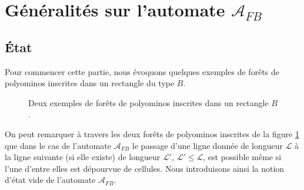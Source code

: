 \section{ Généralités sur l'automate $\mathcal{A}_{FB}$}
\begin{spacing}{0.30}
\subsection{État}
\end{spacing}
Pour commencer cette partie, nous évoquons quelques exemples de forêts de polyominos inscrites dans un rectangle du type $B$.
\begin{figure}[!htb]
\begin{minipage}[c]{.46\linewidth}
        \centering
\begin{logicpuzzle}[rows=7,columns=8,color=cyan!100,width=750px,scale=0.5]
\end{logicpuzzle}
\end{minipage}
\hfill
\begin{minipage}[c]{.46\linewidth}
        \centering
\begin{logicpuzzle}[rows=10,columns=10,color=cyan!100,width=750px,scale=0.5]
\end{logicpuzzle}
\end{minipage}
 \caption{\label{fig1chap3} Deux exemples de forêts de polyominos   inscrites dans un rectangle $B$.}
\end{figure}
On peut remarquer à travers les deux forêts de polyominos inscrites de la figure \ref{fig1chap3} que dans le cas de l'automate $\mathcal{A}_{FB}$ le  passage d'une ligne donnée de longueur $\mathcal{L}$ à la ligne suivante (si  elle existe) de longueur $\mathcal{L}'$, $\mathcal{L}'\leq \mathcal{L} $, est possible même si l'une d'entre elles est dépourvue de cellules. Nous  introduisons ainsi la notion d'état vide de l'automate $\mathcal{A}_{FB}$.
